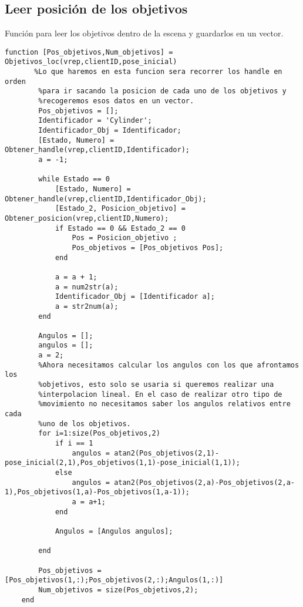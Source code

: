 \subsection{Leer posición de los objetivos}
Función para leer los objetivos dentro de la escena y guardarlos en un vector.
\begin{lstlisting}[frame=single]
function [Pos_objetivos,Num_objetivos] = Objetivos_loc(vrep,clientID,pose_inicial)
       %Lo que haremos en esta funcion sera recorrer los handle en orden
        %para ir sacando la posicion de cada uno de los objetivos y
        %recogeremos esos datos en un vector.
        Pos_objetivos = [];
        Identificador = 'Cylinder';
        Identificador_Obj = Identificador;
        [Estado, Numero] = Obtener_handle(vrep,clientID,Identificador);
        a = -1;
        
        while Estado == 0
            [Estado, Numero] = Obtener_handle(vrep,clientID,Identificador_Obj);
            [Estado_2, Posicion_objetivo] = Obtener_posicion(vrep,clientID,Numero);
            if Estado == 0 && Estado_2 == 0 
                Pos = Posicion_objetivo ;
                Pos_objetivos = [Pos_objetivos Pos];
            end
           
            a = a + 1;
            a = num2str(a);
            Identificador_Obj = [Identificador a]; 
            a = str2num(a);
        end
        
        Angulos = [];
        angulos = [];
        a = 2;
        %Ahora necesitamos calcular los angulos con los que afrontamos los
        %objetivos, esto solo se usaria si queremos realizar una
        %interpolacion lineal. En el caso de realizar otro tipo de
        %movimiento no necesitamos saber los angulos relativos entre cada
        %uno de los objetivos.
        for i=1:size(Pos_objetivos,2)
            if i == 1
                angulos = atan2(Pos_objetivos(2,1)-pose_inicial(2,1),Pos_objetivos(1,1)-pose_inicial(1,1));
            else
                angulos = atan2(Pos_objetivos(2,a)-Pos_objetivos(2,a-1),Pos_objetivos(1,a)-Pos_objetivos(1,a-1));
                a = a+1;
            end
            
            Angulos = [Angulos angulos];
            
        end
        
        Pos_objetivos = [Pos_objetivos(1,:);Pos_objetivos(2,:);Angulos(1,:)]
        Num_objetivos = size(Pos_objetivos,2);
    end
\end{lstlisting}
